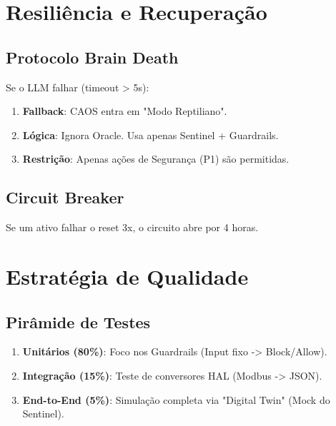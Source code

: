 \documentclass[12pt, a4paper]{article}
\begin{document}
\section{Resiliência e Recuperação}
\label{sec:dr}

\subsection{Protocolo Brain Death}
Se o LLM falhar (timeout > 5s):
\begin{enumerate}
    \item \textbf{Fallback}: CAOS entra em "Modo Reptiliano".
    \item \textbf{Lógica}: Ignora Oracle. Usa apenas Sentinel + Guardrails.
    \item \textbf{Restrição}: Apenas ações de Segurança (P1) são permitidas.
\end{enumerate}

\subsection{Circuit Breaker}
Se um ativo falhar o reset 3x, o circuito abre por 4 horas.

\newpage

\section{Estratégia de Qualidade}
\label{sec:qa}

\subsection{Pirâmide de Testes}
\begin{enumerate}
    \item \textbf{Unitários (80\%)}: Foco nos Guardrails (Input fixo -> Block/Allow).
    \item \textbf{Integração (15\%)}: Teste de conversores HAL (Modbus -> JSON).
    \item \textbf{End-to-End (5\%)}: Simulação completa via "Digital Twin" (Mock do Sentinel).
\end{enumerate}
\end{document}
